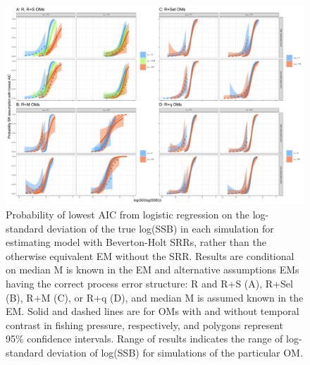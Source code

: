 \documentclass[
  12pt,
]{article}
\begin{document}
\begin{landscape}
\begin{figure}
\begin{center}
\includegraphics[height = 0.8\textheight]{sr_aic_plots_rev}
\end{center}
\caption{Probability of lowest AIC from logistic regression on the log-standard deviation of the true log(SSB) in each simulation for estimating model with Beverton-Holt SRRs, rather than the otherwise equivalent EM without the SRR. Results are conditional on median M is known in the EM and alternative assumptions EMs having the correct process error structure: R and R+S (A), R+Sel (B), R+M (C), or R+q (D), and median M is assumed known in the EM. Solid and dashed lines are for OMs with and without temporal contrast in fishing pressure, respectively, and polygons represent 95\% confidence intervals. Range of results indicates the range of log-standard deviation of log(SSB) for simulations of the particular OM.}\label{sr_aic}
\end{figure}
\end{landscape}
\end{document}
